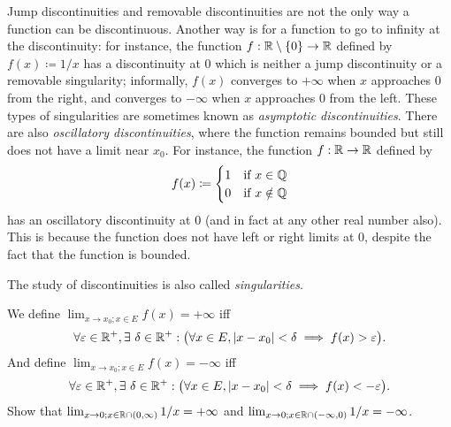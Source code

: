 \begin{rmk}\label{9.5.4}
  Jump discontinuities and removable discontinuities are not the only way a function can be discontinuous.
  Another way is for a function to go to infinity at the discontinuity:
  for instance, the function \(f : \mathbb{R} \setminus \{0\} \to \mathbb{R}\) defined by \(f(x) \coloneqq 1 / x\) has a discontinuity at \(0\) which is neither a jump discontinuity or a removable singularity;
  informally, \(f(x)\) converges to \(+\infty\) when \(x\) approaches \(0\) from the right, and converges to \(-\infty\) when \(x\) approaches \(0\) from the left.
  These types of singularities are sometimes known as \emph{asymptotic discontinuities}.
  There are also \emph{oscillatory discontinuities}, where the function remains bounded but still does not have a limit near \(x_0\).
  For instance, the function \(f : \mathbb{R} \to \mathbb{R}\) defined by
  \[
    f(x) \coloneqq \begin{cases}
      1 & \text{if } x \in \mathbb{Q}    \\
      0 & \text{if } x \notin \mathbb{Q}
    \end{cases}
  \]
  has an oscillatory discontinuity at \(0\) (and in fact at any other real number also).
  This is because the function does not have left or right limits at \(0\), despite the fact that the function is bounded.
\end{rmk}

\begin{note}
  The study of discontinuities is also called \emph{singularities}.
\end{note}

\begin{ac}\label{ac:9.5.2}
  We define \(\lim_{x \to x_0 ; x \in E} f(x) = +\infty\) iff
  \[
    \forall \varepsilon \in \R^+, \exists\ \delta \in \R^+ : \big(\forall x \in E, \abs{x - x_0} < \delta \implies f(x) > \varepsilon\big).
  \]
  And define \(\lim_{x \to x_0 ; x \in E} f(x) = -\infty\) iff
  \[
    \forall \varepsilon \in \R^+, \exists\ \delta \in \R^+ : \big(\forall x \in E, \abs{x - x_0} < \delta \implies f(x) < -\varepsilon\big).
  \]
  Show that \(\lim_{x \to 0 ; x \in \mathbb{R} \cap (0, \infty)} 1 / x = +\infty\) and \(\lim_{x \to 0 ; x \in \mathbb{R} \cap (-\infty, 0)} 1 / x = -\infty\).
\end{ac}

